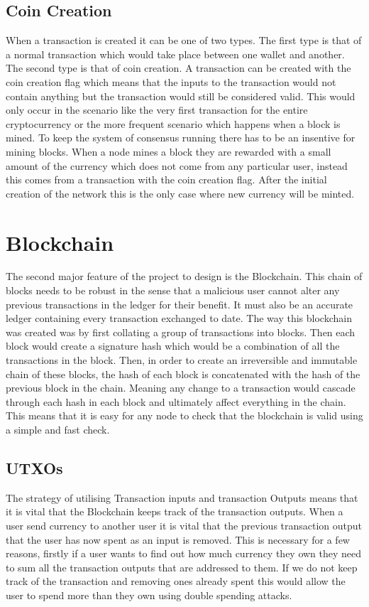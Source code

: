 \documentclass{l4proj}
\begin{document}
\subsection{Coin Creation}
When a transaction is created it can be one of two types. The first type is that of a normal transaction which would take place
between one wallet and another. The second type is that of coin creation. A transaction can be created with the 
coin creation flag which means that the inputs to the transaction would not contain anything but the transaction
would still be considered valid. This would only occur in the scenario like the very first transaction for the entire
cryptocurrency or the more frequent scenario which happens when a block is mined. To keep the system of consensus 
running there has to be an insentive for mining blocks. When a node mines a block they are rewarded with a small
amount of the currency which does not come from any particular user, instead this comes from a transaction with the
coin creation flag. After the initial creation of the network this is the only case where new currency will be
minted.


\section{Blockchain}
The second major feature of the project to design is the Blockchain. This chain of blocks needs to be robust in
the sense that a malicious user cannot alter any previous transactions in the ledger for their benefit. It must
also be an accurate ledger containing every transaction exchanged to date. The way this blockchain was created was
by first collating a group of transactions into blocks. Then each block would create a signature hash which would
be a combination of all the transactions in the block. Then, in order to create an irreversible and immutable chain
of these blocks, the hash of each block is concatenated with the hash of the previous block in the chain. Meaning
any change to a transaction would cascade through each hash in each block and ultimately affect everything in the
chain. This means that it is easy for any node to check that the blockchain is valid using a simple and fast check.



\subsection{UTXOs}
The strategy of utilising Transaction inputs and transaction Outputs means that it is vital that the Blockchain
keeps track of the transaction outputs. When a user send currency to another user it is vital that the previous 
transaction output that the user has now spent as an input is removed. This is necessary for a few reasons, 
firstly if a user wants to find out how much currency they own they need to sum all the transaction outputs that 
are addressed to them. If we do not keep track of the transaction and removing ones already spent this would
allow the user to spend more than they own using double spending attacks.
\end{document}
